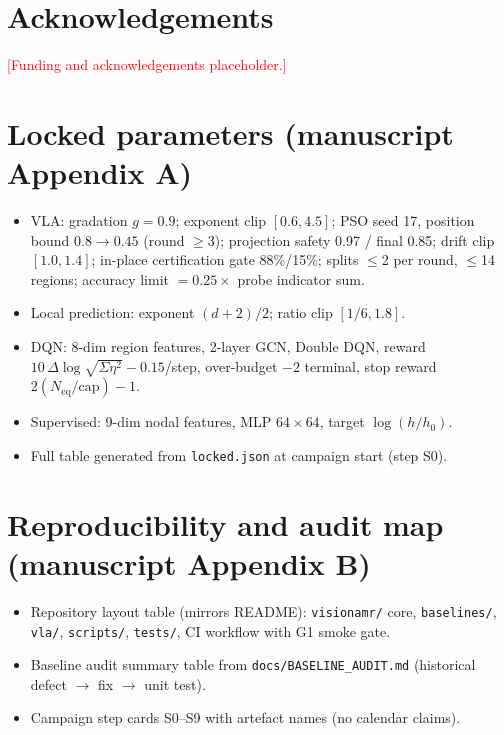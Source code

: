 \documentclass[preprint,12pt]{elsarticle}
\newcommand{\Neq}{N_{\mathrm{eq}}}
\newcommand{\todo}[1]{\textcolor{red}{[#1]}}
\newenvironment{plan}{\begin{itemize}\setlength\itemsep{0.15em}}{\end{itemize}}
\begin{document}
\section*{Acknowledgements}
\todo{Funding and acknowledgements placeholder.}

\appendix
\section{Locked parameters (manuscript Appendix A)}
\begin{plan}
  \item VLA: gradation $g=0.9$; exponent clip $[0.6,4.5]$; PSO seed 17, position bound
        $0.8\to0.45$ (round $\ge$3); projection safety 0.97 / final 0.85; drift clip
        $[1.0,1.4]$; in-place certification gate 88\%/15\%; splits $\le$2 per round,
        $\le$14 regions; accuracy limit $=0.25\times$ probe indicator sum.
  \item Local prediction: exponent $(d+2)/2$; ratio clip $[1/6,1.8]$.
  \item DQN: 8-dim region features, 2-layer GCN, Double DQN, reward
        $10\,\Delta\log\sqrt{\Sigma\eta^2}-0.15$/step, over-budget $-2$ terminal, stop
        reward $2(\Neq/\text{cap})-1$.
  \item Supervised: 9-dim nodal features, MLP $64\times64$, target $\log(h/h_0)$.
  \item Full table generated from \texttt{locked.json} at campaign start (step S0).
\end{plan}

\section{Reproducibility and audit map (manuscript Appendix B)}
\begin{plan}
  \item Repository layout table (mirrors README): \texttt{visionamr/} core,
        \texttt{baselines/}, \texttt{vla/}, \texttt{scripts/}, \texttt{tests/}, CI
        workflow with G1 smoke gate.
  \item Baseline audit summary table from \texttt{docs/BASELINE\_AUDIT.md}
        (historical defect $\to$ fix $\to$ unit test).
  \item Campaign step cards S0--S9 with artefact names (no calendar claims).
\end{plan}
\end{document}
